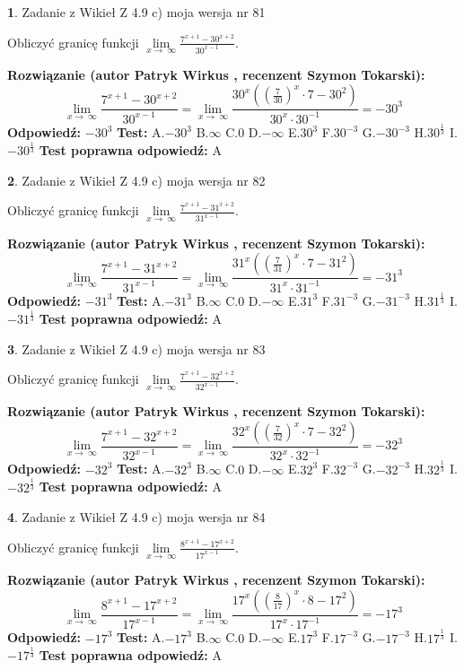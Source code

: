 \documentclass[12pt, a4paper]{article}
\theoremstyle{definition} %
\newtheorem{zad}{}
\newcommand{\zadStart}[1]{\begin{zad}#1\newline}
\newcommand{\zadStop}{\end{zad}}
\newcommand{\rozwStart}[2]{\noindent \textbf{Rozwiązanie (autor #1 , recenzent #2): }\newline}
\newcommand{\rozwStop}{\newline}
\newcommand{\odpStart}{\noindent \textbf{Odpowiedź:}\newline}
\newcommand{\odpStop}{\newline}
\newcommand{\testStart}{\noindent \textbf{Test:}\newline}
\newcommand{\testStop}{\newline}
\newcommand{\kluczStart}{\noindent \textbf{Test poprawna odpowiedź:}\newline}
\newcommand{\kluczStop}{\newline}
\begin{document}
\zadStart{Zadanie z Wikieł Z 4.9 c) moja wersja nr 81}


Obliczyć granicę funkcji  $\lim\limits_{x\to\ \infty}\frac{7^{x+1}-30^{x+2}}{30^{x-1}}$.
\zadStop
\rozwStart{Patryk Wirkus}{Szymon Tokarski}
$$\lim\limits_{x\to\ \infty}\frac{7^{x+1}-30^{x+2}}{30^{x-1}}=\lim\limits_{x\to\ \infty}\frac{30^{x}((\frac{7}{30})^{x}\cdot 7 -30^{2})}{30^{x}\cdot 30^{-1}} = -30^{3}$$
\rozwStop
\odpStart
$-30^{3}$
\odpStop
\testStart
A.$-30^{3}$ B.$\infty$ C.$0$ D.$-\infty$ E.$30^{3}$
F.$30^{-3}$ G.$-30^{-3}$
H.$30^{\frac{1}{3}}$
I.$-30^{\frac{1}{3}}$
\testStop
\kluczStart
A
\kluczStop



\zadStart{Zadanie z Wikieł Z 4.9 c) moja wersja nr 82}


Obliczyć granicę funkcji  $\lim\limits_{x\to\ \infty}\frac{7^{x+1}-31^{x+2}}{31^{x-1}}$.
\zadStop
\rozwStart{Patryk Wirkus}{Szymon Tokarski}
$$\lim\limits_{x\to\ \infty}\frac{7^{x+1}-31^{x+2}}{31^{x-1}}=\lim\limits_{x\to\ \infty}\frac{31^{x}((\frac{7}{31})^{x}\cdot 7 -31^{2})}{31^{x}\cdot 31^{-1}} = -31^{3}$$
\rozwStop
\odpStart
$-31^{3}$
\odpStop
\testStart
A.$-31^{3}$ B.$\infty$ C.$0$ D.$-\infty$ E.$31^{3}$
F.$31^{-3}$ G.$-31^{-3}$
H.$31^{\frac{1}{3}}$
I.$-31^{\frac{1}{3}}$
\testStop
\kluczStart
A
\kluczStop



\zadStart{Zadanie z Wikieł Z 4.9 c) moja wersja nr 83}


Obliczyć granicę funkcji  $\lim\limits_{x\to\ \infty}\frac{7^{x+1}-32^{x+2}}{32^{x-1}}$.
\zadStop
\rozwStart{Patryk Wirkus}{Szymon Tokarski}
$$\lim\limits_{x\to\ \infty}\frac{7^{x+1}-32^{x+2}}{32^{x-1}}=\lim\limits_{x\to\ \infty}\frac{32^{x}((\frac{7}{32})^{x}\cdot 7 -32^{2})}{32^{x}\cdot 32^{-1}} = -32^{3}$$
\rozwStop
\odpStart
$-32^{3}$
\odpStop
\testStart
A.$-32^{3}$ B.$\infty$ C.$0$ D.$-\infty$ E.$32^{3}$
F.$32^{-3}$ G.$-32^{-3}$
H.$32^{\frac{1}{3}}$
I.$-32^{\frac{1}{3}}$
\testStop
\kluczStart
A
\kluczStop



\zadStart{Zadanie z Wikieł Z 4.9 c) moja wersja nr 84}


Obliczyć granicę funkcji  $\lim\limits_{x\to\ \infty}\frac{8^{x+1}-17^{x+2}}{17^{x-1}}$.
\zadStop
\rozwStart{Patryk Wirkus}{Szymon Tokarski}
$$\lim\limits_{x\to\ \infty}\frac{8^{x+1}-17^{x+2}}{17^{x-1}}=\lim\limits_{x\to\ \infty}\frac{17^{x}((\frac{8}{17})^{x}\cdot 8 -17^{2})}{17^{x}\cdot 17^{-1}} = -17^{3}$$
\rozwStop
\odpStart
$-17^{3}$
\odpStop
\testStart
A.$-17^{3}$ B.$\infty$ C.$0$ D.$-\infty$ E.$17^{3}$
F.$17^{-3}$ G.$-17^{-3}$
H.$17^{\frac{1}{3}}$
I.$-17^{\frac{1}{3}}$
\testStop
\kluczStart
A
\kluczStop
\end{document}

